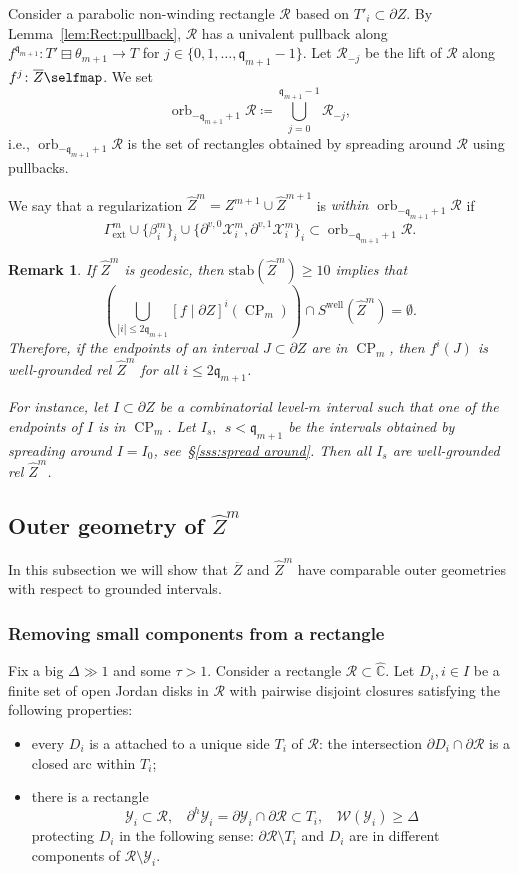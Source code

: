 \documentclass{amsart}
\renewcommand{\sp}{{\ \ }}
\newcommand{\1}{{\mathbb 1 }}
\newcommand{\ext}{{\operatorname{ext}}}
\newcommand{\Width}{{\mathcal W}}
\newcommand{\stab}{{\text{stab}}}
\newcommand\YY{\mathcal{Y}}
\newcommand\RR{\mathcal{R}}
\newcommand\XX{\mathcal{X}}
\newcommand{\wZ}{{\widehat Z}}
\newcommand{\qq}{\mathfrak{q}}
\newcommand{\well}{{\operatorname{well}}}
\newcommand{\wC}{\widehat{\mathbb{C}}}
\newtheorem{rem}[thm]{Remark}
\theoremstyle{remark}
\numberwithin{equation}{section}
\theoremstyle{definition}
\newcommand{\orb}{\operatorname{orb}}
\newcommand{\CP}{{\operatorname{CP}}}
\begin{document}
 Consider a parabolic non-winding rectangle $\RR$ based on $T'_i\subset \partial Z$.  By Lemma~\ref{lem:Rect:pullback}, $\RR$ has a univalent pullback along $f^{\qq_{m+1}}\colon {T'\boxminus \theta_{m+1}}\to T$ for ${j\in \{0,1,\dots, \qq_{m+1}-1\}}$. Let $\RR_{-j}$ be the lift of $\RR$ along $f^j\colon \overline Z\selfmap$. We set 
 \[\orb_{-\qq_{m+1}+1} \RR \coloneqq  \bigcup _{j=0}^{\qq_{m+1}-1}  \RR_{-j},\]
i.e., $\orb_{-\qq_{m+1}+1} \RR$ is the set of rectangles obtained by spreading around $\RR$ using pullbacks. 
 
 We say that a regularization $\wZ^{m}=Z^{m+1}\cup \wZ^{m+1}$ is \emph{within $\orb_{-\qq_{m+1}+1} \RR$} if 
\[   \Gamma^m_\ext\cup \{\beta^m_i\}_i\cup \{ \partial^{v, 0}\XX^m_i, \partial^{v,1}\XX^m_i \}_i\subset \orb_{-\qq_{m+1}+1} \RR.\] 


\begin{rem}
\label{rem:easy cond:well ground} If $\wZ^m$ is geodesic, then $\stab(\wZ^m)\ge 10$ implies that
\begin{equation}
\label{eq:rem:easy cond:well ground}
\left(\bigcup_{|i|\le 2\qq_{m+1}} [f\mid \partial Z]^i(\CP_m)\right)  \cap S^\well (\wZ^m)=\emptyset.
\end{equation} 
Therefore, if the endpoints of an interval $J\subset \partial Z$ are in $\CP_m$, then $f^i(J)$ is well-grounded rel $\wZ^m$ for all $i\le 2\qq_{m+1}$.


For instance, let $I\subset \partial Z$ be a combinatorial level-$m$ interval such that one of the endpoints of $I$ is in $\CP_m$. Let $I_s, \sp s<\qq_{m+1}$ be the intervals obtained by spreading around $I=I_0$, see~\S\ref{sss:spread around}. Then all $I_s$ are well-grounded rel $\wZ^m$.
\end{rem}


\subsection{Outer geometry of $\wZ^m$}
\label{ss:WellGrounded}
In this subsection we will show that $\overline Z$ and $\wZ^m$ have comparable outer geometries with respect to grounded intervals. 
\subsubsection{Removing small components from a rectangle}  Fix a big $\Delta\gg 1$ and some $\tau>1$. Consider a rectangle $\RR\subset \wC$. Let $D_i, i\in I$ be a finite set of open Jordan disks in $\RR$ with pairwise disjoint closures satisfying the following properties:
\begin{itemize}
\item[(A)] every $D_i$ is a attached to a unique side $T_i$ of $\RR$: the intersection $\partial D_i \cap \partial \RR$ is a closed arc within $T_i$;
\item[(B)] there is a rectangle \[\YY_i\subset \RR,\sp\sp \partial^h \YY_i =\partial \YY_i\cap \partial \RR \subset T_i,\sp\sp \Width(\YY_i)\ge \Delta \] protecting $D_i$ in the following sense: $\partial \RR\setminus T_i$ and $D_i$ are in different components of $\RR\setminus \YY_i$.
\end{itemize}
\end{document}

